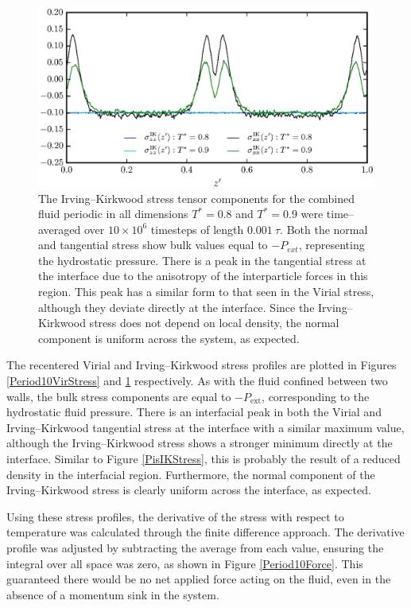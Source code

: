\begin{figure}[h]
\centering
\includegraphics[scale=1.0]{Period10IKStress}
\caption{The Irving--Kirkwood stress tensor components for the combined fluid periodic in all dimensions $T^{*} = 0.8$ and $T^{*} = 0.9$ were time--averaged over $10 \times 10^{6}$ timesteps of length $0.001\ \tau$.
Both the normal and tangential stress show bulk values equal to $-P_{ext}$, representing the hydrostatic pressure.
There is a peak in the tangential stress at the interface due to the anisotropy of the interparticle forces in this region.
This peak has a similar form to that seen in the Virial stress, although they deviate directly at the interface.
Since the Irving--Kirkwood stress does not depend on local density, the normal component is uniform across the system, as expected.
}
\label{Period10IKStress}
\end{figure}
The recentered Virial and Irving--Kirkwood stress profiles are plotted in Figures \ref{Period10VirStress} and \ref{Period10IKStress} respectively.
As with the fluid confined between two walls, the bulk stress components are equal to $-P_{\mathrm{ext}}$, corresponding to the hydrostatic fluid pressure.
There is an interfacial peak in both the Virial and Irving--Kirkwood tangential stress at the interface with a similar maximum value, although the Irving--Kirkwood stress shows a stronger minimum directly at the interface.
Similar to Figure \ref{PisIKStress}, this is probably the result of a reduced density in the interfacial region.
Furthermore, the normal component of the Irving--Kirkwood stress is clearly uniform across the interface, as expected.

\FloatBarrier
Using these stress profiles, the derivative of the stress with respect to temperature was calculated through the finite difference approach.
The derivative profile was adjusted by subtracting the average from each value, ensuring the integral over all space was zero, as shown in Figure \ref{Period10Force}.
This guaranteed there would be no net applied force acting on the fluid, even in the absence of a momentum sink in the system.

